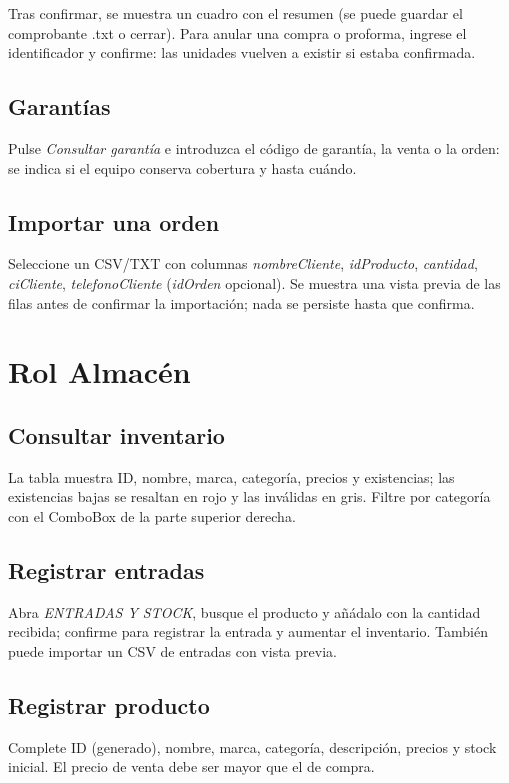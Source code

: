 \documentclass[12pt,a4paper]{report}
\begin{document}
Tras confirmar, se muestra un cuadro con el resumen (se puede guardar el comprobante .txt o cerrar). Para anular una compra o proforma, ingrese el identificador y confirme: las unidades vuelven a existir si estaba confirmada.

\subsection{Garantías}
Pulse \emph{Consultar garantía} e introduzca el código de garantía, la venta o la orden: se indica si el equipo conserva cobertura y hasta cuándo.

\subsection{Importar una orden}
Seleccione un CSV/TXT con columnas \emph{nombreCliente}, \emph{idProducto}, \emph{cantidad}, \emph{ciCliente}, \emph{telefonoCliente} (\emph{idOrden} opcional). Se muestra una vista previa de las filas antes de confirmar la importación; nada se persiste hasta que confirma.

\section{Rol Almacén}

\subsection{Consultar inventario}

La tabla muestra ID, nombre, marca, categoría, precios y existencias; las existencias bajas se resaltan en rojo y las inválidas en gris. Filtre por categoría con el ComboBox de la parte superior derecha.

\subsection{Registrar entradas}

Abra \emph{ENTRADAS Y STOCK}, busque el producto y añádalo con la cantidad recibida; confirme para registrar la entrada y aumentar el inventario. También puede importar un CSV de entradas con vista previa.

\subsection{Registrar producto}
Complete ID (generado), nombre, marca, categoría, descripción, precios y stock inicial. El precio de venta debe ser mayor que el de compra.
\end{document}
